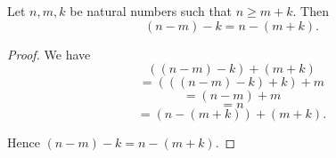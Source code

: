 \documentclass[../arithmetic.tex]{subfiles}
\begin{document}
  \begin{forthel}
    \begin{proposition}
      Let $n, m, k$ be natural numbers such that $n \geq  m \plus k$.
      Then \[ (n \minus m) \minus k = n \minus (m \plus k). \]
    \end{proposition}
    \begin{proof}
      We have
      \[  ((n \minus m) \minus k) \plus (m \plus k)       \]
      \[    = (((n \minus m) \minus k) \plus k) \plus m   \]
      \[    = (n \minus m) \plus m               \]
      \[    = n                         \]
      \[    = (n \minus (m \plus k)) \plus (m \plus k).  \]

      Hence $(n \minus m) \minus k = n \minus (m \plus k)$.
    \end{proof}
  \end{forthel}
\end{document}
